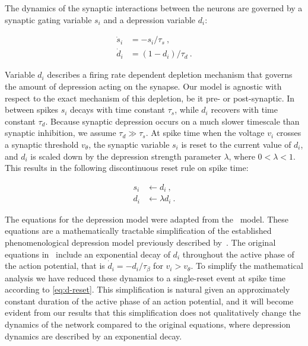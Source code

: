 \documentclass[utf8,draft]{frontiersFPHY} %
\begin{document}
The dynamics of the synaptic interactions between the neurons are governed by a synaptic gating variable $s_{i}$ and a depression variable $d_{i}$:
\begin{linenomath}
  \begin{align}
    \dot s_{i} &= -s_{i}/\tau_{s}~\label{eq:dot-s},\\
    \dot d_{i} &= (1-d_{i})/\tau_{d}~\label{eq:dot-d}.
  \end{align}
\end{linenomath}
Variable $d_{i}$ describes a firing rate dependent depletion mechanism that governs the amount of depression acting on the synapse.
Our model is agnostic with respect to the exact mechanism of this depletion, be it pre- or post-synaptic.
In between spikes $s_{i}$ decays with time constant $\tau_{s}$, while $d_{i}$ recovers with time constant $\tau_{d}$.
Because synaptic depression occurs on a much slower timescale than synaptic inhibition, we assume $\tau_{d}\gg\tau_{s}$.
At spike time when the voltage $v_{i}$ crosses a synaptic threshold $v_{\theta}$, the synaptic variable $s_{i}$ is reset to the current value of $d_{i}$, and $d_{i}$ is scaled down by the depression strength parameter $\lambda$, where $0<\lambda<1$.
This results in the following discontinuous reset rule on spike time:
\begin{linenomath}
  \begin{align}
    s_{i} &\leftarrow d_{i}~\label{eq:s-reset},\\
    d_{i} &\leftarrow \lambda d_{i}~\label{eq:d-reset}.
  \end{align}
\end{linenomath}
The equations for the depression model were adapted from the~\citet{bose2001} model.
These equations are a mathematically tractable simplification of the established phenomenological depression model previously described by~\citet{tsodyks1997}.
The original equations in~\cite{bose2001} include an exponential decay of $d_{i}$ throughout the active phase of the action potential, that is $\dot d_{i}=-d_{i}/\tau_{\beta}$ for $v_{i}>v_{\theta}$.
To simplify the mathematical analysis we have reduced these dynamics to a single-reset event at spike time according to \cref{eq:d-reset}.
This simplification is natural given an approximately constant duration of the active phase of an action potential, and it will become evident from our results that this simplification does not qualitatively change the dynamics of the network compared to the original equations, where depression dynamics are described by an exponential decay.
\end{document}
